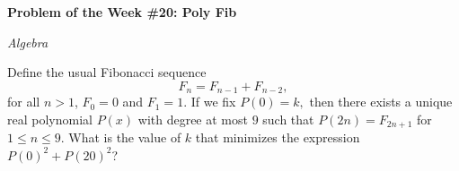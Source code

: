 \begin{potw}\vspace{5pt}
{\large\textbf{Problem of the Week \#20: Poly Fib}}\vspace{5pt}

\textit{Algebra}\V

Define the usual Fibonacci sequence \[F_n = F_{n-1}+F_{n-2},\] for all $n>1$, $F_0=0$ and $F_1=1$. If we fix $P(0)=k,$ then there exists a unique real polynomial \(P(x)\) with degree at most $9$ such that \(P(2n) = F_{2n+1}\) for \(1 \leq n \leq 9\). What is the value of $k$ that minimizes the expression \(P(0)^2 + P(20)^2\)? 
\end{potw}\V
